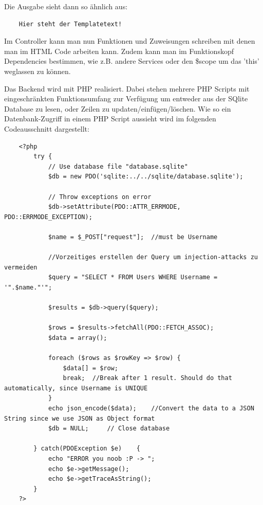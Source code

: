 \documentclass[11pt,a4paper]{article} %
\begin{document}
Die Ausgabe sieht dann so ähnlich aus:
\begin{frame}

\begin{lstlisting}
	Hier steht der Templatetext!
\end{lstlisting}
\end{frame}

Im Controller kann man nun Funktionen und Zuweisungen schreiben mit denen man im HTML Code arbeiten kann. Zudem kann man im Funktionskopf Dependencies bestimmen, wie z.B. andere Services oder den \$scope um das 'this' weglassen zu können.

Das Backend wird mit PHP realisiert. Dabei stehen mehrere PHP Scripts mit eingeschränkten Funktionsumfang zur Verfügung um entweder aus der SQlite Database zu lesen, oder Zeilen zu updaten/einfügen/löschen. Wie so ein Datenbank-Zugriff in einem PHP Script aussieht wird im folgenden Codeausschnitt dargestellt:

\begin{frame}

\begin{lstlisting}
	<?php
		try {
		    // Use database file "database.sqlite" 
		    $db = new PDO('sqlite:../../sqlite/database.sqlite');
		    
		    // Throw exceptions on error
		    $db->setAttribute(PDO::ATTR_ERRMODE, PDO::ERRMODE_EXCEPTION);

		    $name = $_POST["request"];	//must be Username

		    //Vorzeitiges erstellen der Query um injection-attacks zu vermeiden
		    $query = "SELECT * FROM Users WHERE Username = '".$name."'";

			$results = $db->query($query);

			$rows = $results->fetchAll(PDO::FETCH_ASSOC);
			$data = array();

			foreach ($rows as $rowKey => $row) {
				$data[] = $row;
				break;	//Break after 1 result. Should do that automatically, since Username is UNIQUE
			}
			echo json_encode($data);	//Convert the data to a JSON String since we use JSON as Object format
		    $db = NULL;		// Close database

		} catch(PDOException $e) 	{
		    echo "ERROR you noob :P -> ";
		    echo $e->getMessage();
		    echo $e->getTraceAsString();
		}
	?>	
\end{lstlisting}
\end{frame}
\end{document}
